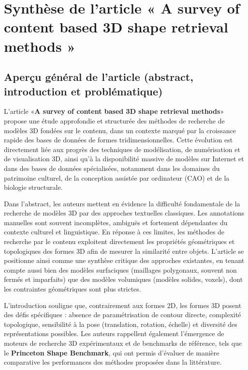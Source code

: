 \documentclass[11pt,a4paper,oneside]{report}
\begin{document}
\chapter{Synthèse de l’article « A survey of content based 3D shape retrieval methods »}

\section{Aperçu général de l’article (abstract, introduction et problématique)}

L’article «\textbf{A survey of content based 3D shape retrieval methods}» propose une étude approfondie et structurée des méthodes de recherche de modèles 3D fondées sur le contenu, dans un contexte marqué par la croissance rapide des bases de données de formes tridimensionnelles. Cette évolution est directement liée aux progrès des techniques de modélisation, de numérisation et de visualisation 3D, ainsi qu’à la disponibilité massive de modèles sur Internet et dans des bases de données spécialisées, notamment dans les domaines du patrimoine culturel, de la conception assistée par ordinateur (CAO) et de la biologie structurale.

Dans l’abstract, les auteurs mettent en évidence la difficulté fondamentale de la recherche de modèles 3D par des approches textuelles classiques. Les annotations manuelles sont souvent incomplètes, ambiguës et fortement dépendantes du contexte culturel et linguistique. En réponse à ces limites, les méthodes de recherche par le contenu exploitent directement les propriétés géométriques et topologiques des formes 3D afin de mesurer la similarité entre objets. L’article se positionne ainsi comme une synthèse critique des approches existantes, en tenant compte aussi bien des modèles surfaciques (maillages polygonaux, souvent non fermés et imparfaits) que des modèles volumiques (modèles solides, voxels), dont les contraintes géométriques sont plus strictes.

L’introduction souligne que, contrairement aux formes 2D, les formes 3D posent des défis spécifiques : absence de paramétrisation de contour directe, complexité topologique, sensibilité à la pose (translation, rotation, échelle) et diversité des représentations possibles. Les auteurs rappellent également l’émergence de moteurs de recherche 3D expérimentaux et de benchmarks de référence, tels que le \textbf{Princeton Shape Benchmark}, qui ont permis d’évaluer de manière comparative les performances des méthodes proposées dans la littérature.
\end{document}

